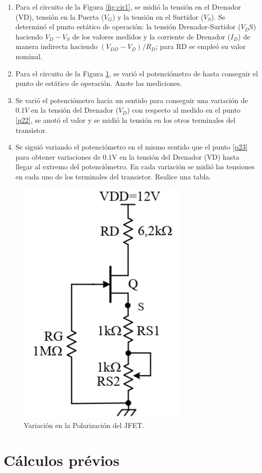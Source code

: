 \documentclass[12pt, a4paper]{article}
\begin{document}
    \begin{enumerate}
        \item \label{p21}	Para el circuito de la Figura \ref{fig:cir1}, se midió la tensión en el Drenador (VD), tensión en la Puerta ($V_G$) y la tensión en el Surtidor ($V_S$). Se determinó el punto estático de operación: la tensión Drenador-Surtidor ($V_D$S) haciendo $V_D-V_S$ de los valores medidos y la corriente de Drenador ($I_D$) de manera indirecta haciendo $(V_{DD}-V_D)/R_D$; para RD se empleó su valor nominal.
        \item \label{p22}	Para el circuito de la Figura \ref{fig:cir2}, se varió el potenciómetro de hasta conseguir el punto de estático de operación. Anote las mediciones.
        \item \label{p23} 	Se varió el potenciómetro hacia un sentido para conseguir una variación de $0.1V$ en la tensión del Drenador ($V_D$) con respecto al medido en el punto \ref{p22}, se anotó el valor y se midió la tensión en los otros terminales del transistor.
        \item \label{p24} 	Se siguió variando el potenciómetro en el mismo sentido que el punto \ref{p23} para obtener variaciones de 0.1V en la tensión del Drenador (VD) hasta llegar al extremo del potenciómetro. En cada variación se midió las tensiones en cada uno de los terminales del transistor. Realice una tabla.
    \end{enumerate}

    \begin{figure}[h!]
        \centering
        \includegraphics[height=5cm\textwidth]{circuito2.jpg}
        \caption{Variación en la Polarización del JFET.}
        \label{fig:cir2}
    \end{figure}

    \newpage

    \section{Cálculos prévios}
\end{document}
